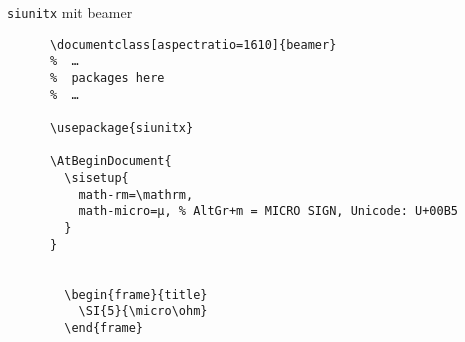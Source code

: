 \begin{BeamerCodeFrame}[fragile]{\texttt{siunitx} mit beamer}
  \begin{center}
    \begin{lstlisting}
      \documentclass[aspectratio=1610]{beamer}
      %  …
      %  packages here
      %  …

      \usepackage{siunitx}

      \AtBeginDocument{
        \sisetup{
          math-rm=\mathrm,
          math-micro=µ, % AltGr+m = MICRO SIGN, Unicode: U+00B5
        }
      }

      
        \begin{frame}{title}
          \SI{5}{\micro\ohm}
        \end{frame}
      
    \end{lstlisting}
  \end{center}
\end{BeamerCodeFrame}
